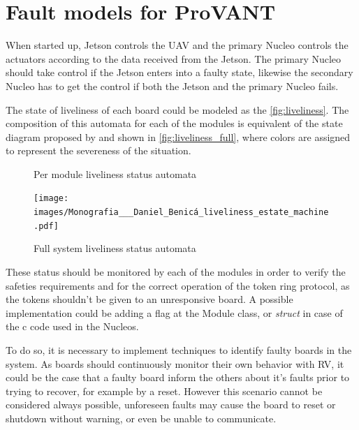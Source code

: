 \section{Fault models for ProVANT}

When started up, Jetson controls the \gls{UAV} and the primary Nucleo controls the actuators according to the data received from the Jetson. The primary Nucleo should take control if the Jetson enters into a faulty state, likewise the secondary Nucleo has to get the control if both the Jetson and the primary Nucleo fails.

The state of liveliness of each board could be modeled as the \autoref{fig:liveliness}. The composition of this automata for each of the modules is equivalent of the state diagram proposed by \textcite{benica_design_2024} and shown in \autoref{fig:liveliness_full}, where colors are assigned to represent the severeness of the situation.

\begin{figure}[!htb]
    \centering
    \caption{\label{fig:liveliness} Per module liveliness status automata}
    
\end{figure}

\begin{figure}[!htb]
    \centering
    \caption{\label{fig:liveliness_full} Full system liveliness status automata}
    \texttt{[image: images/Monografia\_\_\_Daniel\_Benicá\_liveliness\_estate\_machine.pdf]}
\end{figure}

These status should be monitored by each of the modules in order to verify the safeties requirements
and for the correct operation of the token ring protocol, as the tokens shouldn't be given to an unresponsive board. %
A possible implementation could be adding a flag at the Module class, or \textit{struct} in case of the c code used in the Nucleos.

To do so, it is necessary to implement techniques to identify faulty boards in the system. As boards should continuously monitor their own behavior with \gls{RV}, it could be the case that a faulty board inform the others about it's faults prior to trying to recover, for example by a reset. However this scenario cannot be considered always possible, unforeseen faults may cause the board to reset or shutdown without warning, or even be unable to communicate.

